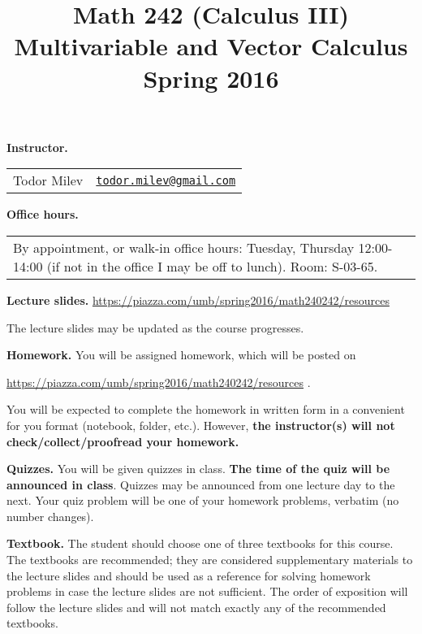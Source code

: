 \documentclass{article}
\title{\vskip -2cm 
Math 242  (Calculus III)\\
Multivariable and Vector Calculus \\ Spring 2016}
\date{}
\newcommand{\websitebase}{https://piazza.com/umb/spring2016/math240242}
\begin{document}
\maketitle


\noindent \textbf{Instructor.} 
\begin{tabular}{ll}
Todor Milev & \href{mailto:todor.milev@gmail.com}{\nolinkurl{todor.milev@gmail.com}}  
\end{tabular}

\medskip
\noindent \textbf{Office hours. } \begin{tabular}{p{12cm}}
By appointment, or walk-in office hours: Tuesday, Thursday 12:00-14:00 (if not in the office I may be off to lunch).  Room: S-03-65.\\
\end{tabular}





\medskip \noindent \textbf{Lecture slides. }  \url{\websitebase/resources}

\medskip\noindent The lecture slides may be updated as the course progresses.




\medskip
\noindent \textbf{Homework.} You will be assigned homework, which will be posted on

\url{\websitebase/resources} \quad \quad \quad .

\noindent You will be expected to complete the homework in written form in a convenient for you format (notebook, folder, etc.). However, \textbf{the instructor(s) will not check/collect/proofread your homework.} 
 
\medskip
\noindent \textbf{Quizzes.} You will be given quizzes in class. \textbf{The time of the quiz will be announced in class}. Quizzes may be announced from one lecture day to the next. Your quiz problem will be one of your homework problems, verbatim (no number changes).



\medskip\noindent \textbf{Textbook. } The student should choose one of three textbooks for this course. The textbooks are recommended; they are considered supplementary materials to the lecture slides and should be used as a reference for solving homework problems in case the lecture slides are not sufficient. The order of exposition will follow the lecture slides and will not match exactly any of the recommended textbooks.
\end{document}
